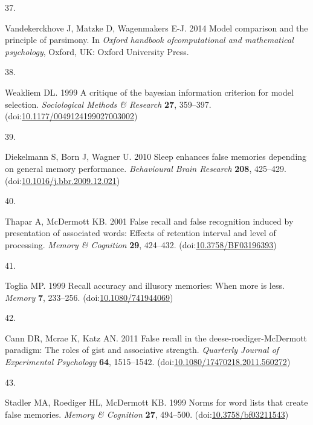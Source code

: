 \documentclass[
]{article}
\newlength{\cslhangindent}
\newlength{\csllabelwidth}
\newlength{\cslentryspacingunit} %
\newenvironment{CSLReferences}[2] %
 {%
  \setlength{\parindent}{0pt}
  \ifodd #1
  \let\oldpar\par
  \def\par{\hangindent=\cslhangindent\oldpar}
  \fi
  \setlength{\parskip}{#2\cslentryspacingunit}
 }%
 {}
\newcommand{\CSLLeftMargin}[1]{\parbox[t]{\csllabelwidth}{#1}}
\newcommand{\CSLRightInline}[1]{\parbox[t]{\linewidth - \csllabelwidth}{#1}\break}
\begin{document}
\begin{CSLReferences}{0}{0}
\leavevmode{}%
\CSLLeftMargin{37. }%
\CSLRightInline{Vandekerckhove J, Matzke D, Wagenmakers E-J. 2014 Model comparison and the principle of parsimony. In \emph{Oxford handbook ofcomputational and mathematical psychology}, Oxford, UK: Oxford University Press. }

\leavevmode{}%
\CSLLeftMargin{38. }%
\CSLRightInline{Weakliem DL. 1999 A critique of the bayesian information criterion for model selection. \emph{Sociological Methods \& Research} \textbf{27}, 359--397. (doi:\href{https://doi.org/10.1177/0049124199027003002}{10.1177/0049124199027003002})}

\leavevmode{}%
\CSLLeftMargin{39. }%
\CSLRightInline{Diekelmann S, Born J, Wagner U. 2010 Sleep enhances false memories depending on general memory performance. \emph{Behavioural Brain Research} \textbf{208}, 425--429. (doi:\href{https://doi.org/10.1016/j.bbr.2009.12.021}{10.1016/j.bbr.2009.12.021})}

\leavevmode{}%
\CSLLeftMargin{40. }%
\CSLRightInline{Thapar A, McDermott KB. 2001 False recall and false recognition induced by presentation of associated words: Effects of retention interval and level of processing. \emph{Memory \& Cognition} \textbf{29}, 424--432. (doi:\href{https://doi.org/10.3758/BF03196393}{10.3758/BF03196393})}

\leavevmode{}%
\CSLLeftMargin{41. }%
\CSLRightInline{Toglia MP. 1999 Recall accuracy and illusory memories: When more is less. \emph{Memory} \textbf{7}, 233--256. (doi:\href{https://doi.org/10.1080/741944069}{10.1080/741944069})}

\leavevmode{}%
\CSLLeftMargin{42. }%
\CSLRightInline{Cann DR, Mcrae K, Katz AN. 2011 False recall in the deese-roediger-McDermott paradigm: The roles of gist and associative strength. \emph{Quarterly Journal of Experimental Psychology} \textbf{64}, 1515--1542. (doi:\href{https://doi.org/10.1080/17470218.2011.560272}{10.1080/17470218.2011.560272})}

\leavevmode{}%
\CSLLeftMargin{43. }%
\CSLRightInline{Stadler MA, Roediger HL, McDermott KB. 1999 Norms for word lists that create false memories. \emph{Memory \& Cognition} \textbf{27}, 494--500. (doi:\href{https://doi.org/10.3758/bf03211543}{10.3758/bf03211543})}


\end{CSLReferences}
\end{document}
